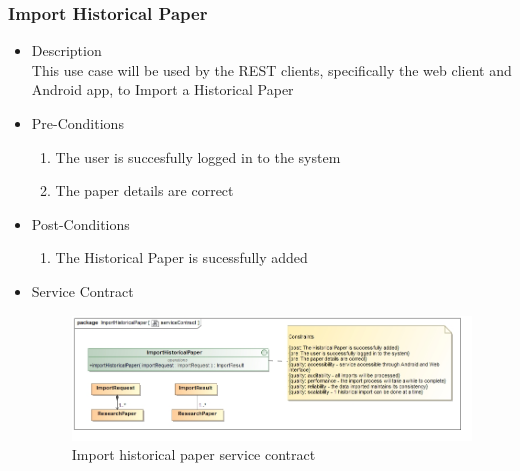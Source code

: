 \documentclass[a4paper,10pt]{article}
\begin{document}
\subsubsection{Import Historical Paper}
	\begin{itemize}
		\item Description\\
			This use case will be used by the REST clients, specifically the web client and Android app, to Import a Historical Paper
		\item Pre-Conditions
			\begin{enumerate}
				\item The user is succesfully logged in to the system
				\item The paper details are correct
			\end{enumerate}
		\item Post-Conditions
			\begin{enumerate}
				\item The Historical Paper is sucessfully added
						
			\end{enumerate}
		\item Service Contract
		\begin{figure}[H]
			\includegraphics[scale=0.5]{ImportHistoricalPaperServiceContract}
			\caption{Import historical paper service contract}
		\end{figure}
	\end{itemize}
\end{document}
